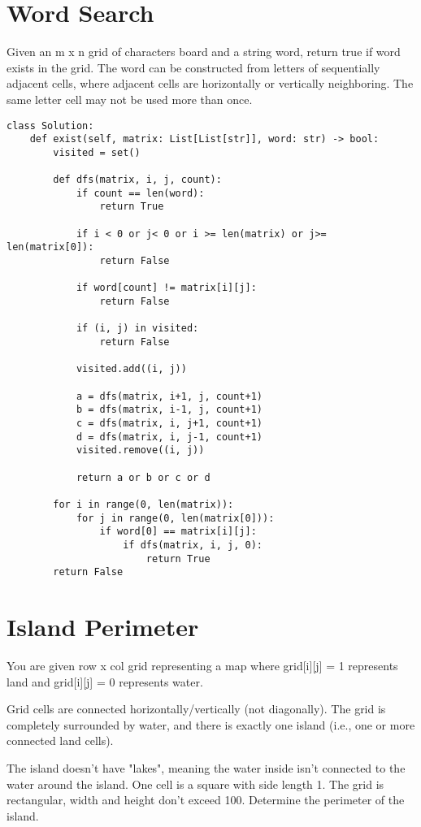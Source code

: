 \documentclass[24pt, a4]{article}
\begin{document}
\section{Word Search}
Given an m x n grid of characters board and a string word, return true if 
word exists in the grid.
The word can be constructed from letters of sequentially adjacent cells, 
where adjacent cells are horizontally or vertically neighboring. The 
same letter cell may not be used more than once.
\begin{lstlisting}
class Solution:
    def exist(self, matrix: List[List[str]], word: str) -> bool:
        visited = set()

        def dfs(matrix, i, j, count):
            if count == len(word):
                return True

            if i < 0 or j< 0 or i >= len(matrix) or j>= len(matrix[0]):
                return False

            if word[count] != matrix[i][j]:
                return False

            if (i, j) in visited:
                return False

            visited.add((i, j))

            a = dfs(matrix, i+1, j, count+1)
            b = dfs(matrix, i-1, j, count+1)
            c = dfs(matrix, i, j+1, count+1)
            d = dfs(matrix, i, j-1, count+1)
            visited.remove((i, j))

            return a or b or c or d

        for i in range(0, len(matrix)):
            for j in range(0, len(matrix[0])):
                if word[0] == matrix[i][j]:
                    if dfs(matrix, i, j, 0):
                        return True
        return False
\end{lstlisting}
\newpage
\section{Island Perimeter}
You are given row x col grid representing a map where grid[i][j] = 1 
represents land and grid[i][j] = 0 represents water.

Grid cells are connected horizontally/vertically (not diagonally). The 
grid is completely surrounded by water, and there is exactly one island 
(i.e., one or more connected land cells).

The island doesn't have "lakes", meaning the water inside isn't connected to 
the water around the island. One cell is a square with side length 1. 
The grid is rectangular, width and height don't exceed 100. 
Determine the perimeter of the island.
\end{document}
